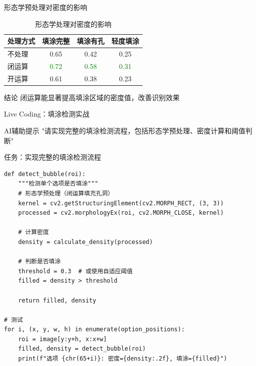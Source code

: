 \begin{frame}{形态学预处理对密度的影响}
    \begin{table}
        \centering
        \begin{tabular}{l|c|c|c}
        \toprule
        处理方式 & 填涂完整 & 填涂有孔 & 轻度填涂 \\
        \midrule
        不处理 & 0.65 & 0.42 & 0.25 \\
        闭运算 & \textcolor{green}{0.72} & \textcolor{green}{0.58} & \textcolor{green}{0.31} \\
        开运算 & 0.61 & 0.38 & 0.23 \\
        \bottomrule
        \end{tabular}
        \caption{形态学处理对密度的影响}
    \end{table}

    \begin{alertblock}{结论}
    闭运算能显著提高填涂区域的密度值，改善识别效果
    \end{alertblock}
\end{frame}

\begin{frame}[fragile]{Live Coding：填涂检测实战}
    \begin{block}{AI辅助提示}
        \aihint{} "请实现完整的填涂检测流程，包括形态学预处理、密度计算和阈值判断"
    \end{block}

    \begin{block}{任务：实现完整的填涂检测流程}
    \begin{lstlisting}[basicstyle=\ttfamily\scriptsize]
def detect_bubble(roi):
    """检测单个选项是否填涂"""
    # 形态学预处理（闭运算填充孔洞）
    kernel = cv2.getStructuringElement(cv2.MORPH_RECT, (3, 3))
    processed = cv2.morphologyEx(roi, cv2.MORPH_CLOSE, kernel)

    # 计算密度
    density = calculate_density(processed)

    # 判断是否填涂
    threshold = 0.3  # 或使用自适应阈值
    filled = density > threshold

    return filled, density

# 测试
for i, (x, y, w, h) in enumerate(option_positions):
    roi = image[y:y+h, x:x+w]
    filled, density = detect_bubble(roi)
    print(f"选项 {chr(65+i)}: 密度={density:.2f}, 填涂={filled}")
    \end{lstlisting}
    \end{block}
\end{frame}
